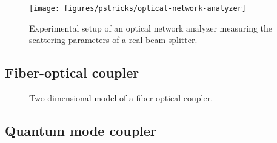 \begin{figure}[htb]
    \centering
    \texttt{[image: figures/pstricks/optical-network-analyzer]}
    \caption{Experimental setup of an optical network analyzer measuring the scattering parameters of a real beam splitter.}\label{fig:beam_splitter_network_analyzer}
\end{figure}

\FloatBarrier
\subsection{Fiber-optical coupler}

\begin{figure}[htb]
	\centering
	
	\caption{Two-dimensional model of a fiber-optical coupler.}\label{fig:fiber_coupler}
\end{figure}

\FloatBarrier
\subsection{Quantum mode coupler}



